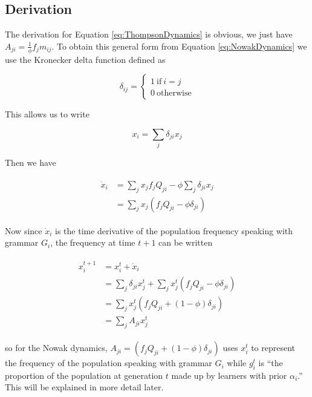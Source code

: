 \documentclass[11pt,letterpaper]{article}
\begin{document}
\subsection{Derivation}
\label{sub:Derivation}

The derivation for Equation \ref{eq:ThompsonDynamics} is obvious, we just have $A_{ji} = \frac{1}{\phi} f_j m_{ij}$.
To obtain this general form from Equation \ref{eq:NowakDynamics} we use the
Kronecker delta function defined as 

\[
  \delta_{ij} = \begin{cases}
    1~\mathrm{if}~i = j \\
    0~\mathrm{otherwise} 
  \end{cases}
\]

This allows us to write 

\[
  x_i = \sum_j \delta_{ji} x_j
\]

Then we have 

\begin{align}
  \begin{split}
  \dot{x}_i &= \sum_j x_j f_j Q_{ji} - \phi \sum_j \delta_{ji} x_j \\
            &= \sum_j x_j \left( f_j Q_{ji} - \phi \delta_{ji} \right)
  \end{split}
\end{align}

Now since $\dot{x}_i$ is the time derivative of the population frequency 
speaking with grammar $G_i$, the frequency at time $t+1$ can be written

\begin{align}
  \begin{split}
  x^{t+1}_i &= x^{t}_i + \dot{x}_i \\
            &= \sum_j \delta_{ji} x^{t}_j + \sum_j x^t_j \left( f_j Q_{ji} - \phi \delta_{ji} \right) \\
            &= \sum_j x^t_j \left( f_j Q_{ji} + (1 - \phi) \delta_{ji} \right) \\
            &= \sum_j A_{ji} x^t_j
  \end{split}
\end{align}

\noindent so for the Nowak dynamics, 
$A_{ji} = \left( f_j Q_{ji} + (1 - \phi) \delta_{ji} \right)$
 uses $x^t_i$ to represent the frequency of the population
speaking with grammar $G_i$ while $g^t_i$ is ``the proportion of the population 
at generation $t$ made up by learners with prior $\alpha_i$.'' This will be
explained in more detail later.




\setlength{\bibleftmargin}{.125in}
\setlength{\bibindent}{-\bibleftmargin}


\end{document}
